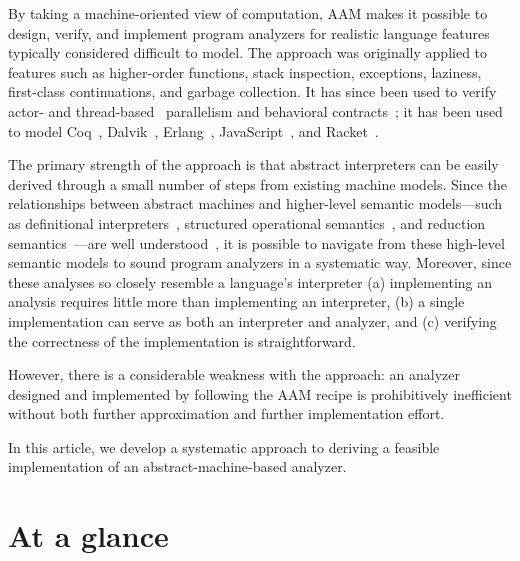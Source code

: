 \documentclass[preprint,onecolumn,9pt]{sigplanconf} %
\begin{document}
%

By taking a
machine-oriented view of computation, AAM makes it possible to design,
verify, and implement program analyzers for realistic language
features typically considered difficult to model.  The approach was
originally applied to features such as higher-order functions,
stack inspection, exceptions, laziness, first-class continuations, and
garbage collection.  It has since been used to verify actor-
\cite{local:DOsualdo:12A} and
thread-based~\cite{dvanhorn:Might2011Family} parallelism and
behavioral contracts~\cite{dvanhorn:TobinHochstadt2012Higherorder}; it
has been used to model Coq~\cite{local:harvard},
Dalvik~\cite{local:dalvik}, Erlang~\cite{local:DOsualdo:12B},
JavaScript~\cite{local:DBLP:journals/corr/abs-1109-4467}, and
Racket~\cite{dvanhorn:TobinHochstadt2012Higherorder}.

The primary strength of the approach is that abstract interpreters can
be easily derived through a small number of steps from existing
machine models.  Since the relationships between abstract machines and
higher-level semantic models---such as definitional
interpreters~\cite{dvanhorn:reynolds-hosc98}, structured operational
semantics~\cite{dvanhorn:Plotkin1981Structural}, and reduction
semantics~\cite{dvanhorn:Felleisen2009Semantics}---are well
understood~\cite{dvanhorn:Danvy:DSc}, it is possible to navigate from
these high-level semantic models to sound program analyzers in a
systematic way.  Moreover, since these analyses so closely resemble a
language's interpreter (a) implementing an analysis requires little
more than implementing an interpreter, (b) a single implementation can
serve as both an interpreter and analyzer, and (c) verifying the
correctness of the implementation is straightforward.

However, there is a considerable weakness with the approach: an
analyzer designed and implemented by following the AAM recipe is
prohibitively inefficient without both further approximation and
further implementation effort.

In this article, we develop a systematic approach to deriving a
feasible implementation of an abstract-machine-based analyzer.

\section{At a glance}
\end{document}
